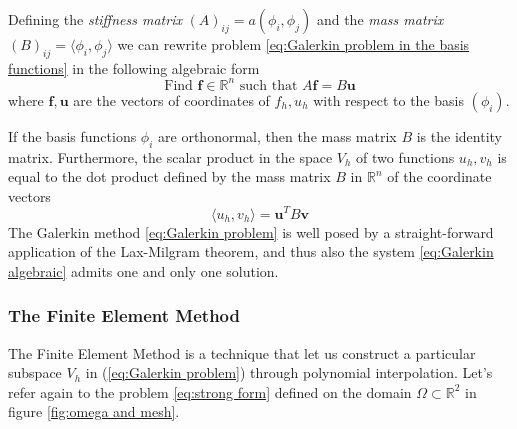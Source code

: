 Defining the \textit{stiffness matrix} $(A)_{ij} = a(\phi_i, \phi_j)$ and the \textit{mass matrix} \\$(B)_{ij} = \langle \phi_i, \phi_j\rangle$ we can rewrite problem \ref{eq:Galerkin problem in the basis functions} in the following algebraic form
\begin{equation}\label{eq:Galerkin algebraic}
\text{Find }\mathbf f\in\mathbb R^n\text{ such that } A\mathbf f = B \mathbf u
\end{equation}
where $\mathbf f, \mathbf u$ are the vectors of coordinates of $f_h, u_h$ with respect to the basis $(\phi_i)$. 
\vspace{0.5cm}
\begin{remark}
	 If the basis functions $\phi_i$ are orthonormal, then the mass matrix $B$ is the identity matrix. Furthermore, the scalar product in the space $V_h$ of two functions $u_h, v_h$ is equal to the dot product defined by the mass matrix $B$ in $\mathbb R^n$ of the coordinate vectors
	\begin{equation}\label{eq:dot product}
	\langle u_h, v_h\rangle = \mathbf u^T B \mathbf v
	\end{equation}
	The Galerkin method \ref{eq:Galerkin problem} is well posed by a straight-forward application of the Lax-Milgram theorem, and thus also the system \ref{eq:Galerkin algebraic} admits one and only one solution.
\end{remark}

 \subsubsection{The Finite Element Method}
 
  The Finite Element Method is a technique that let us construct a particular subspace $V_h$ in (\ref{eq:Galerkin problem}) through polynomial interpolation. Let's refer again to the problem \ref{eq:strong form} defined on the domain $\Omega\subset\mathbb R^2$ in figure \ref{fig:omega and mesh}. 
